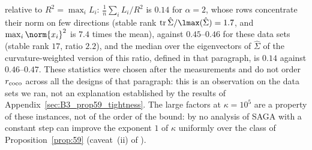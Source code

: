 relative to $R^2=\max_iL_i$: $\frac1n\sum_iL_i/R^2$ is $0.14$ for $\alpha=2$, whose rows concentrate their norm on few
directions (stable rank $\mathrm{tr}\,\hat\Sigma/\lmax(\hat\Sigma)=1.7$, and $\max_i\norm{x_i}^2$ is $7.4$ times the
mean), against $0.45$--$0.46$ for these data sets (stable rank $17$, ratio $2.2$), and the median over the eigenvectors of
$\hat\Sigma$ of the curvature-weighted version of this ratio, defined in that paragraph, is $0.14$ against $0.46$--$0.47$.
These statistics were chosen after the measurements and do not order $r_{\rm coco}$ across all the designs of that
paragraph: this is an observation on the data sets we ran, not an explanation established by the results of
Appendix~\ref{sec:B3_prop59_tightness}.
The large factors at $\kappa=10^5$ are a property of these instances, not of the order of the bound: by
 no analysis of SAGA with a constant step can improve the exponent $1$ of $\kappa$
uniformly over the class of Proposition~\ref{prop:59} (caveat~(ii) of ).

